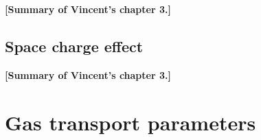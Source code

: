 	{\color{blue} \textbf{[Summary of Vincent's chapter 3.]}}
	
	\subsection{Space charge effect}
	\label{chapt4:ssec:space-charge}
	
	{\color{blue} \textbf{[Summary of Vincent's chapter 3.]}}

\section{Gas transport parameters}
\label{chapt4:sec:transport}



\clearpage{\pagestyle{empty}\cleardoublepage}
